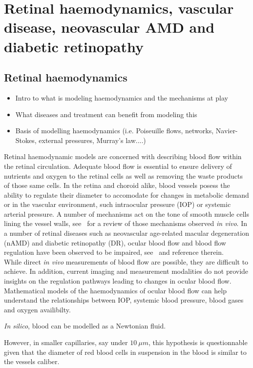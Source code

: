 \documentclass[12pt,a4paper]{article}
\begin{document}
\twocolumn 
\section{Retinal haemodynamics, vascular disease, neovascular AMD and diabetic retinopathy}

\subsection{Retinal haemodynamics}
\begin{itemize}
\item Intro to what is modeling haemodynamics and the mechanisms at play
\item What diseases and treatment can benefit from modeling this
\item Basis of modelling haemodynamics (i.e. Poiseuille flows, networks, Navier-Stokes, external pressures, Murray's law....)
\end{itemize}
Retinal haemodynamic models are concerned with describing blood flow within the retinal circulation.
Adequate blood flow is essential to ensure delivery of nutrients and oxygen to the retinal cells as well as removing the waste products of those same cells.
In the retina and choroid alike, blood vessels posess the ability to regulate their diameter to accomodate for changes in metabolic demand or in the vascular environment, such intraocular pressure (IOP) or systemic arterial pressure.
A number of mechanisms act on the tone of smooth muscle cells lining the vessel walls, see~\cite{Kur_2012} for a review of those mechanisms observed \textit{in vivo}.
In a number of retinal diseases such as neovascular age-related macular degeneration (nAMD) and diabetic retinopathy (DR), ocular blood flow and blood flow regulation have been observed to be impaired, see~\cite{Kur_2012} and reference therein.\\
While direct \textit{in vivo} measurements of blood flow are possible, they are difficult to achieve.
In addition, current imaging and measurement modalities do not provide insights on the regulation pathways leading to changes in ocular blood flow.
Mathematical models of the haemodynamics of ocular blood flow can help understand the relationships between IOP, systemic blood pressure, blood gases and oxygen availibilty.

\textit{In silico}, blood can be modelled as a Newtonian fluid.

However, in smaller capillaries, say under $10~\mu m$, this hypothesis is questionnable given that the diameter of red blood cells in suspension in the blood is similar to the vessels caliber.
\end{document}
